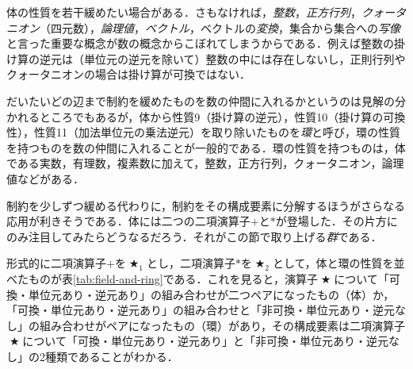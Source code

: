 \documentclass[twocolumn]{jsbook}
\newcommand{\keyword}[1]{{\emph{#1}}}
\DeclareMathOperator{\mathAnyBinaryOperator}{\bigstar}
\begin{document}
体の性質を若干緩めたい場合がある．さもなければ，\keyword{整数}，\keyword{正方行列}，\keyword{クォータニオン}（四元数），\keyword{論理値}，\keyword{ベクトル}，ベクトルの\keyword{変換}，集合から集合への\keyword{写像}と言った重要な概念が数の概念からこぼれてしまうからである．例えば整数の掛け算の逆元は（単位元の逆元を除いて）整数の中には存在しないし，正則行列やクォータニオンの場合は掛け算が可換ではない．

だいたいどの辺まで制約を緩めたものを数の仲間に入れるかというのは見解の分かれるところでもあるが，体から性質9（掛け算の逆元），性質10（掛け算の可換性），性質11（加法単位元の乗法逆元）を取り除いたものを\keyword{環}と呼び，環の性質を持つものを数の仲間に入れることが一般的である．環の性質を持つものは，体である実数，有理数，複素数に加えて，整数，正方行列，クォータニオン，論理値などがある．

制約を少しずつ緩める代わりに，制約をその構成要素に分解するほうがさらなる応用が利きそうである．体には二つの二項演算子$+$と$*$が登場した．その片方にのみ注目してみたらどうなるだろう．それがこの節で取り上げる\keyword{群}である．

形式的に二項演算子$+$を$\mathAnyBinaryOperator_1$とし，二項演算子$*$を$\mathAnyBinaryOperator_2$として，体と環の性質を並べたものが表\ref{tab:field-and-ring}である．これを見ると，演算子$\mathAnyBinaryOperator$について「可換・単位元あり・逆元あり」の組み合わせが二つペアになったもの（体）か，「可換・単位元あり・逆元あり」の組み合わせと「非可換・単位元あり・逆元なし」の組み合わせがペアになったもの（環）があり，その構成要素は二項演算子$\mathAnyBinaryOperator$について「可換・単位元あり・逆元あり」と「非可換・単位元あり・逆元なし」の2種類であることがわかる．
\end{document}
